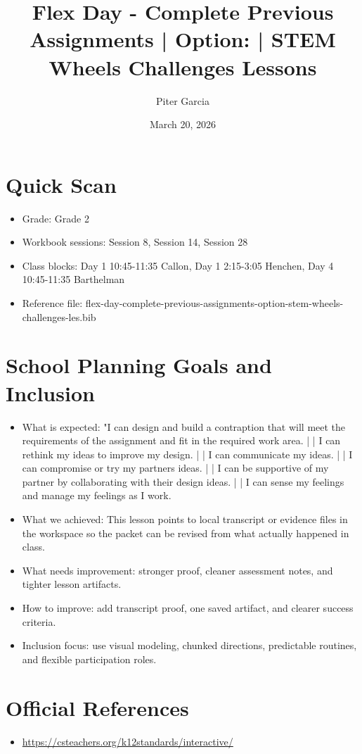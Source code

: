 \documentclass[11pt]{article}
\title{Flex Day - Complete Previous Assignments | Option: | STEM Wheels Challenges Lessons}
\author{Piter Garcia}
\date{March 20, 2026}
\begin{document}
\maketitle
\section*{Quick Scan}
\begin{itemize}[leftmargin=*]
\item Grade: Grade 2
\item Workbook sessions: Session 8, Session 14, Session 28
\item Class blocks: Day 1 10:45-11:35 Callon, Day 1 2:15-3:05 Henchen, Day 4 10:45-11:35 Barthelman
\item Reference file: flex-day-complete-previous-assignments-option-stem-wheels-challenges-les.bib
\end{itemize}
\section*{School Planning Goals and Inclusion}
\begin{itemize}[leftmargin=*]
\item What is expected: "I can design and build a contraption that will meet the requirements of the assignment and fit in the required work area. | | I can rethink my ideas to improve my design. | | I can communicate my ideas. | | I can compromise or try my partners ideas. | | I can be supportive of my partner by collaborating with their design ideas. | | I can sense my feelings and manage my feelings as I work.
\item What we achieved: This lesson points to local transcript or evidence files in the workspace so the packet can be revised from what actually happened in class.
\item What needs improvement: stronger proof, cleaner assessment notes, and tighter lesson artifacts.
\item How to improve: add transcript proof, one saved artifact, and clearer success criteria.
\item Inclusion focus: use visual modeling, chunked directions, predictable routines, and flexible participation roles.
\end{itemize}
\section*{Official References}
\begin{itemize}[leftmargin=*]
\item \url{https://csteachers.org/k12standards/interactive/}

\end{itemize}
\end{document}
